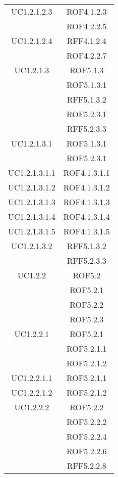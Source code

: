 \begin{longtable}{|c|c|}
\midrule
UC1.2.1.2.3
& ROF4.1.2.3\\
& ROF4.2.2.5\\

\midrule
UC1.2.1.2.4
& RFF4.1.2.4\\
& ROF4.2.2.7\\

\midrule
UC1.2.1.3
& ROF5.1.3\\
& ROF5.1.3.1\\
& RFF5.1.3.2\\
& ROF5.2.3.1\\
& RFF5.2.3.3\\

\midrule
UC1.2.1.3.1
& ROF5.1.3.1\\
& ROF5.2.3.1\\

\midrule
UC1.2.1.3.1.1
& ROF4.1.3.1.1\\

\midrule
UC1.2.1.3.1.2
& ROF4.1.3.1.2\\

\midrule
UC1.2.1.3.1.3
& ROF4.1.3.1.3\\

\midrule
UC1.2.1.3.1.4
& ROF4.1.3.1.4\\

\midrule
UC1.2.1.3.1.5
& ROF4.1.3.1.5\\

\midrule
UC1.2.1.3.2
& RFF5.1.3.2\\
& RFF5.2.3.3\\

\midrule
UC1.2.2
& ROF5.2\\
& ROF5.2.1\\
& ROF5.2.2\\
& ROF5.2.3\\

\midrule
UC1.2.2.1
& ROF5.2.1\\
& ROF5.2.1.1\\
& ROF5.2.1.2\\

\midrule
UC1.2.2.1.1
& ROF5.2.1.1\\

\midrule
UC1.2.2.1.2
& ROF5.2.1.2\\

\midrule
UC1.2.2.2
& ROF5.2.2\\
& ROF5.2.2.2\\
& ROF5.2.2.4\\
& ROF5.2.2.6\\
& RFF5.2.2.8\\


\end{longtable}
